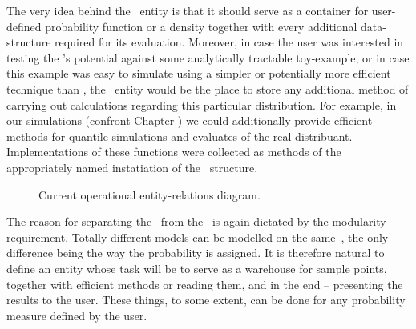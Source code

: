 \documentclass{book}
\begin{document}
The very idea behind the \measure\, entity is that it should serve as a container for user-defined probability function or a density together with every additional data-structure required for its evaluation. Moreover, in case the user was interested in testing the \PTalgo's potential against some analytically tractable toy-example, or in case this example was easy to simulate using a simpler or potentially more efficient technique than \mcmc, the \measure\,
 entity would be the place to store any additional method of carrying out calculations regarding this particular distribution. For example, in our simulations (confront Chapter ) we could  additionally provide efficient methods for quantile simulations and evaluates of the real distribuant. Implementations of these functions were collected as methods of the appropriately named instatiation of the \measure\, structure.  



\begin{figure}
	\caption{Current operational entity-relations diagram.}\label{objectStructure}
\end{figure}

The reason for separating the \measure\, from the \sspace\, is again dictated by the modularity requirement. Totally different models can be modelled on the same \sspace\,, the only difference being the way the probability is assigned. It is therefore natural to define an entity whose task will be to serve as a warehouse for sample points, together with efficient methods or reading them, and in the end -- presenting the results to the user. These things, to some extent, can be done for any probability measure defined by the user. 
\end{document}
